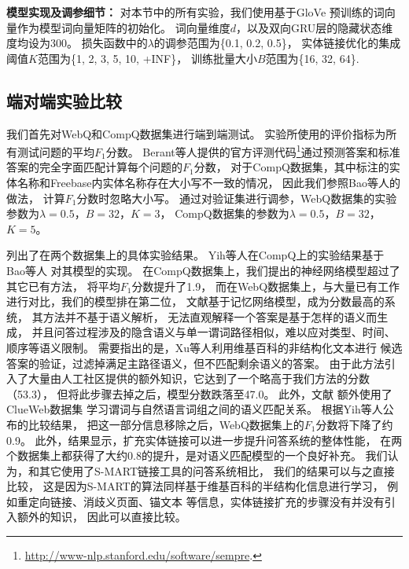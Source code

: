 \textbf{模型实现及调参细节：}
对本节中的所有实验，我们使用基于GloVe\cite{pennington2014glove}
预训练的词向量作为模型词向量矩阵的初始化。
词向量维度$d$，以及双向GRU层的隐藏状态维度均设为300。
损失函数中的$\lambda$的调参范围为\{0.1, 0.2, 0.5\}，
实体链接优化的集成阈值$K$范围为\{1, 2, 3, 5, 10, +INF\}，
训练批量大小$B$范围为\{16, 32, 64\}.



\subsection{端对端实验比较}%

我们首先对WebQ和CompQ数据集进行端到端测试。
实验所使用的评价指标为所有测试问题的平均$F_1$分数。
Berant等人\cite{berant2013semantic}提供的官方评测代码\footnote{
\url{http://www-nlp.stanford.edu/software/sempre}.
}通过预测答案和标准答案的完全字面匹配计算每个问题的$F_1$分数，
对于CompQ数据集，其中标注的实体名称和Freebase内实体名称存在大小写不一致的情况，
因此我们参照Bao等人\cite{bao2016constraint}的做法，
计算$F_1$分数时忽略大小写。
通过对验证集进行调参，WebQ数据集的实验参数为$\lambda=0.5$，$B=32$，$K=3$，
CompQ数据集的参数为$\lambda=0.5$，$B=32$，$K=5$。


列出了在两个数据集上的具体实验结果。
Yih等人\cite{yih2015semantic}在CompQ上的实验结果基于Bao等人\cite{bao2016constraint}
对其模型的实现。
在CompQ数据集上，我们提出的神经网络模型超过了其它已有方法，
将平均$F_1$分数提升了1.9，
而在WebQ数据集上，与大量已有工作进行对比，我们的模型排在第二位，
文献\parencite{jain2016question}基于记忆网络模型，成为分数最高的系统，
其方法并不基于语义解析，
无法直观解释一个答案是基于怎样的语义而生成，
并且问答过程涉及的隐含语义与单一谓词路径相似，难以应对类型、时间、顺序等语义限制。
需要指出的是，Xu等人\cite{xu2016question}利用维基百科的非结构化文本进行
候选答案的验证，过滤掉满足主路径语义，但不匹配剩余语义的答案。
由于此方法引入了大量由人工社区提供的额外知识，它达到了一个略高于我们方法的分数（53.3），
但将此步骤去掉之后，模型分数跌落至47.0。
此外，文献\parencite{yih2015semantic,bao2016constraint}
额外使用了ClueWeb数据集\cite{gabrilovich2013facc1}
学习谓词与自然语言词组之间的语义匹配关系。
根据Yih等人公布的比较结果，
把这一部分信息移除之后，WebQ数据集上的$F_1$分数将下降了约0.9。
此外，结果显示，扩充实体链接可以进一步提升问答系统的整体性能，
在两个数据集上都获得了大约0.8的提升，是对语义匹配模型的一个良好补充。
我们认为，和其它使用了S-MART链接工具的问答系统相比，%
我们的结果可以与之直接比较，
这是因为S-MART的算法同样基于维基百科的半结构化信息进行学习，
例如重定向链接、消歧义页面、锚文本%
等信息，实体链接扩充的步骤没有并没有引入额外的知识，
因此可以直接比较。

